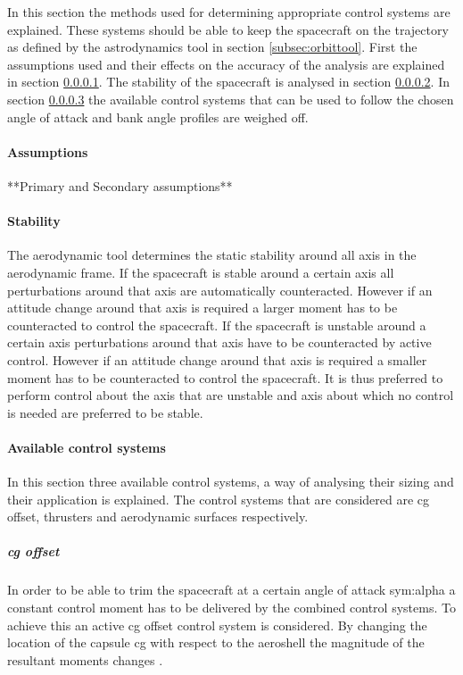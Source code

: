 In this section the methods used for determining appropriate control systems are explained. These systems should be able to keep the spacecraft on the trajectory as defined by the astrodynamics tool in section \ref{subsec:orbittool}. First the assumptions used and their effects on the accuracy of the analysis are explained in section \ref{control:assumptions}. The stability of the spacecraft is analysed in section \ref{control:stab}. In section \ref{control:system} the available control systems that can be used to follow the chosen angle of attack and bank angle profiles are weighed off.

\paragraph{Assumptions}
\label{control:assumptions}

**Primary and Secondary assumptions**

\paragraph{Stability}
\label{control:stab}

The aerodynamic tool determines the static stability around all axis in the aerodynamic frame. If the spacecraft is stable around a certain axis all perturbations around that axis are automatically counteracted. However if an attitude change around that axis is required a larger moment has to be counteracted to control the spacecraft.  If the spacecraft is unstable around a certain axis perturbations around that axis have to be counteracted by active control. However if an attitude change around that axis is required a smaller moment has to be counteracted to control the spacecraft. It is thus preferred to perform control about the axis that are unstable and axis about which no control is needed are preferred to be stable.

\paragraph{Available control systems}
\label{control:system}

In this section three available control systems, a way of analysing their sizing and their application is explained. The control systems that are considered are \gls{cg} offset, thrusters and aerodynamic surfaces respectively.

\subparagraph{\acrlong{cg} offset}

In order to be able to trim the spacecraft at a certain angle of attack \gls{sym:alpha} a constant control moment has to be delivered by the combined control systems. To achieve this an active \gls{cg} offset control system is considered. By changing the location of the capsule \gls{cg} with respect to the aeroshell the magnitude of the resultant moments changes \cite{Mulqueen1991}. 

